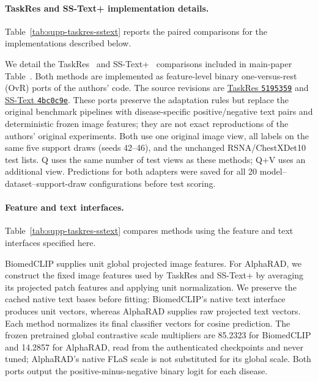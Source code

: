 \paragraph{TaskRes and SS-Text+ implementation details.}
\label{supp:taskres_sstext}
Table~\ref{tab:supp-taskres-sstext} reports the paired comparisons for the implementations described below.

We detail the TaskRes~\cite{taskres} and SS-Text+~\cite{sstextplus} comparisons included in main-paper Table~. Both methods are implemented as feature-level binary one-versus-rest (OvR) ports of the authors' code. The source revisions are \href{https://github.com/geekyutao/TaskRes/tree/5195359661d6bef661090c33b81aacfc7d7cc181}{TaskRes \texttt{5195359}} and \href{https://github.com/jusiro/SS-Text/tree/4bc0c9e3b7b9e0f090079bcc51d7aa852806e91f}{SS-Text \texttt{4bc0c9e}}. These ports preserve the adaptation rules but replace the original benchmark pipelines with disease-specific positive/negative text pairs and deterministic frozen image features; they are not exact reproductions of the authors' original experiments. Both use one original image view, all labels on the same five support draws (seeds 42--46), and the unchanged RSNA/ChestXDet10 test lists. Q uses the same number of test views as these methods; Q+V uses an additional view. Predictions for both adapters were saved for all 20 model--dataset--support-draw configurations before test scoring.

\paragraph{Feature and text interfaces.}
Table~\ref{tab:supp-taskres-sstext} compares methods using the feature and text interfaces specified here.

BiomedCLIP supplies unit global projected image features. For AlphaRAD, we construct the fixed image features used by TaskRes and SS-Text+ by averaging its projected patch features and applying unit normalization. We preserve the cached native text bases before fitting: BiomedCLIP's native text interface produces unit vectors, whereas AlphaRAD supplies raw projected text vectors. Each method normalizes its final classifier vectors for cosine prediction. The frozen pretrained global contrastive scale multipliers are 85.2323 for BiomedCLIP and 14.2857 for AlphaRAD, read from the authenticated checkpoints and never tuned; AlphaRAD's native FLaS scale is not substituted for its global scale. Both ports output the positive-minus-negative binary logit for each disease.

